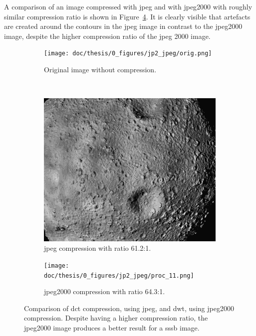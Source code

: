 A comparison of an image compressed with \gls{jpeg} and with \gls{jpeg}2000 with roughly similar compression ratio is shown in Figure~\ref{fig:jpg_jp2_comparison}. It is clearly visible that artefacts are created around the contours in the \gls{jpeg} image in contrast to the \gls{jpeg}2000 image, despite the higher compression ratio of the \gls{jpeg} 2000 image.
\begin{figure}[htb]
    \centering
    \begin{subfigure}[b]{0.7\textwidth}
        \texttt{[image: doc/thesis/0\_figures/jp2\_jpeg/orig.png]}
        \caption{Original image without compression.}
        \label{fig:jpg_jp2_oirg}
    \end{subfigure}
    \\
    \begin{subfigure}[b]{0.48\textwidth}
        \includegraphics[width=\textwidth]{doc/thesis/0_figures/jp2_jpeg/proc_5.jpg}
        \caption{\Gls{jpeg} compression with ratio 61.2:1.}
        \label{fig:jpg_jp2_jpeg}
    \end{subfigure}
    \begin{subfigure}[b]{0.48\textwidth}
        \texttt{[image: doc/thesis/0\_figures/jp2\_jpeg/proc\_11.png]}
        \caption{\Gls{jpeg}2000 compression with ratio 64.3:1.}
        \label{fig:jpg_jp2_jp2}
    \end{subfigure}
    \caption{Comparison of \gls{dct} compression, using \gls{jpeg}, and \gls{dwt}, using \gls{jpeg}2000 compression. Despite having a higher compression ratio, the \gls{jpeg}2000 image produces a better result for a \gls{sssb} image.}
    \label{fig:jpg_jp2_comparison}
\end{figure}

